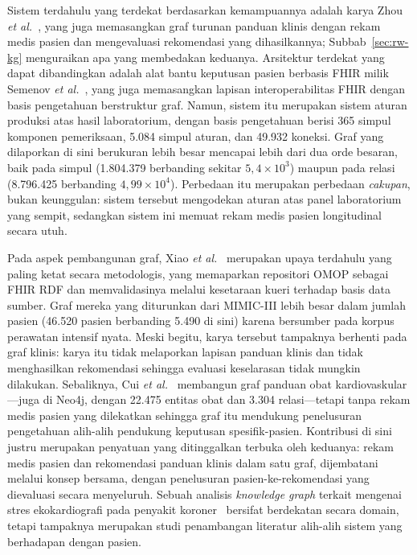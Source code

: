 Sistem terdahulu yang terdekat berdasarkan kemampuannya adalah karya Zhou \textit{et al.}~\cite{zhou2022}, yang
juga memasangkan graf turunan panduan klinis dengan rekam medis pasien dan mengevaluasi rekomendasi
yang dihasilkannya; Subbab~\ref{sec:rw-kg} menguraikan apa yang membedakan keduanya.
Arsitektur terdekat yang dapat dibandingkan adalah alat bantu keputusan pasien berbasis FHIR milik
Semenov \textit{et al.}~\cite{semenov2018}, yang juga memasangkan lapisan interoperabilitas
FHIR dengan basis pengetahuan berstruktur graf. Namun, sistem itu merupakan
sistem aturan produksi atas hasil laboratorium, dengan basis pengetahuan berisi
365 simpul komponen pemeriksaan, 5.084 simpul aturan, dan
49.932 koneksi. Graf yang dilaporkan di sini berukuran lebih besar mencapai lebih dari dua orde
besaran, baik pada simpul (1.804.379 berbanding sekitar $5{,}4\times10^{3}$)
maupun pada relasi (8.796.425 berbanding $4{,}99\times10^{4}$). Perbedaan itu
merupakan perbedaan \emph{cakupan}, bukan keunggulan: sistem tersebut mengodekan
aturan atas panel laboratorium yang sempit, sedangkan sistem ini memuat rekam medis pasien
longitudinal secara utuh.

Pada aspek pembangunan graf, Xiao \textit{et al.}~\cite{xiao2022} merupakan upaya terdahulu
yang paling ketat secara metodologis, yang memaparkan repositori OMOP sebagai FHIR RDF dan
memvalidasinya melalui kesetaraan kueri terhadap basis data sumber. Graf mereka
yang diturunkan dari MIMIC-III lebih besar dalam jumlah pasien (46.520 pasien
berbanding 5.490 di sini) karena bersumber pada korpus perawatan intensif nyata. Meski begitu, karya tersebut tampaknya berhenti pada graf klinis:
karya itu tidak melaporkan lapisan panduan klinis dan tidak menghasilkan rekomendasi
sehingga evaluasi keselarasan tidak mungkin dilakukan. Sebaliknya, Cui
\textit{et al.}~\cite{cui2025} membangun graf panduan obat kardiovaskular---juga di Neo4j,
dengan 22.475 entitas obat dan 3.304 relasi---tetapi
tanpa rekam medis pasien yang dilekatkan sehingga graf itu mendukung
penelusuran pengetahuan alih-alih pendukung keputusan spesifik-pasien. Kontribusi di sini
justru merupakan penyatuan yang ditinggalkan terbuka oleh keduanya: rekam medis pasien dan
rekomendasi panduan klinis dalam satu graf, dijembatani melalui konsep bersama, dengan penelusuran
pasien-ke-rekomendasi yang dievaluasi secara menyeluruh. Sebuah analisis \emph{knowledge
graph} terkait mengenai stres ekokardiografi pada penyakit koroner~\cite{wu2023} bersifat
berdekatan secara domain, tetapi tampaknya merupakan
studi penambangan literatur alih-alih sistem yang berhadapan dengan pasien.

